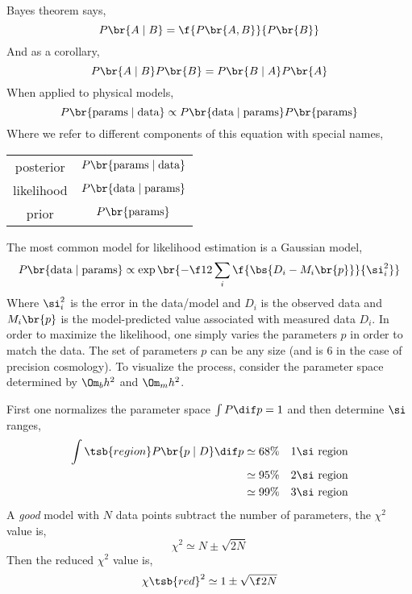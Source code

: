 \documentclass{article}
\begin{document}
Bayes theorem says,
\[ P\br{A \mid B} = \f{P\br{A,B}}{P\br{B}} \]
And as a corollary,
\[ P\br{A \mid B} P\br{B} = P\br{B \mid A}P\br{A} \]
When applied to physical models,
\[ P\br{\text{params}\mid\text{data}}\propto P\br{\text{data}\mid\text{params}}P\br{\text{params}} \]
Where we refer to different components of this equation with special names,
\begin{center}
    \begin{tabular}{cc}
        posterior & $P\br{\text{params}\mid\text{data}}$ \\
        likelihood & $P\br{\text{data}\mid\text{params}}$ \\
        prior & $P\br{\text{params}}$ \\
    \end{tabular}
\end{center}

The most common model for likelihood estimation is a Gaussian model,
\[ P\br{\text{data}\mid\text{params}} \propto \exp\br{-\f12 \sum_i \f{\bs{D_i - M_i\br{p}}}{\si_i^2}} \]
Where $\si_i^2$ is the error in the data/model and $D_i$ is the observed data and $M_i\br{p}$ is the model-predicted value associated with measured data $D_i$. In order to maximize the likelihood, one simply varies the parameters $p$ in order to match the data. The set of parameters $p$ can be any size (and is $6$ in the case of precision cosmology). To visualize the process, consider the parameter space determined by $\Om_b h^2$ and $\Om_m h^2$.
\begin{center}
\end{center}
First one normalizes the parameter space $\int P\dif p = 1$ and then determine $\si$ ranges,
\begin{align*}
    \int\tsb{region} P\br{p \mid D} \dif p
    &\simeq 68\% \quad 1\si \text{ region} \\
    &\simeq 95\% \quad 2\si \text{ region} \\
    &\simeq 99\% \quad 3\si \text{ region} \\
\end{align*}
A \textit{good} model with $N$ data points subtract the number of parameters, the $\chi^2$ value is,
\[ \chi^2 \simeq N \pm \sqrt{2N} \]
Then the reduced $\chi^2$ value is,
\[ \chi\tsb{red}^2 \simeq 1 \pm \sqrt{\f2N} \]
\end{document}
